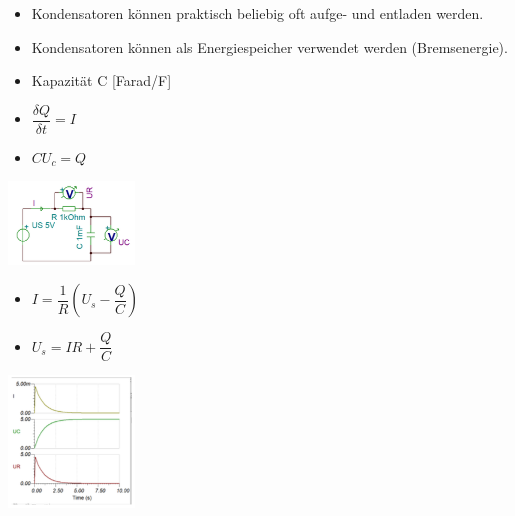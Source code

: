 \documentclass[6pt,a4paper]{scrartcl}
\begin{document}
\begin{multicols*}{4}
\begin{multicols*}{2}
				\begin{itemize}\itemsep0pt
					\item Kondensatoren können praktisch beliebig oft aufge- und entladen werden.
					\item Kondensatoren können als Energiespeicher verwendet werden (Bremsenergie).
					\item Kapazität C [Farad/F]
					\item $\dfrac{\delta Q} {\delta t} = I$
					\item $CU_{c}=Q$
				\end{itemize}
				
			 \end{multicols*}
			 
			 \begin{multicols*}{2}
				\includegraphics[height=2.2cm]{img/kondensator2.png} 
				
				\begin{itemize}\itemsep0pt
					\item $I = \dfrac{1}{R}(U_{s}-\dfrac{Q}{C})$
					\item $U_{s}=IR+\dfrac{Q}{C}$
				\end{itemize}
				
				\includegraphics[height=3.5cm]{img/kondensator3.png} 

			 \end{multicols*}


\end{multicols*}
\end{document}
